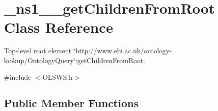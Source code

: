 \hypertarget{class__ns1____getChildrenFromRoot}{
\section{\_\-ns1\_\-\_\-getChildrenFromRoot Class Reference}
\label{class__ns1____getChildrenFromRoot}
}


Top-\/level root element \char`\"{}http://www.ebi.ac.uk/ontology-\/lookup/OntologyQuery\char`\"{}:getChildrenFromRoot.  




{\ttfamily \#include $<$OLSWS.h$>$}

\subsection*{Public Member Functions}
